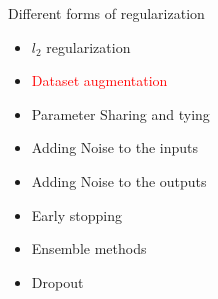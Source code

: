 \begin{frame}
\end{frame}

\begin{frame}
\vspace{4em}
	\begin{overlayarea}{\textwidth}{\textheight}
		\begin{block}{Different forms of regularization}
			\begin{itemize}
				\item $l_2$ regularization
				\item \textcolor<2->{red}{Dataset augmentation}
				\item Parameter Sharing and tying
				\item Adding Noise to the inputs 
				\item Adding Noise to the outputs 
				\item Early stopping
				\item Ensemble methods
				\item Dropout
			\end{itemize}
		\end{block}
	\end{overlayarea}
\end{frame}
\begin{frame}
	\begin{columns}
		\begin{center}
			
		\end{center}
					
	\end{columns}    
\end{frame}
		
